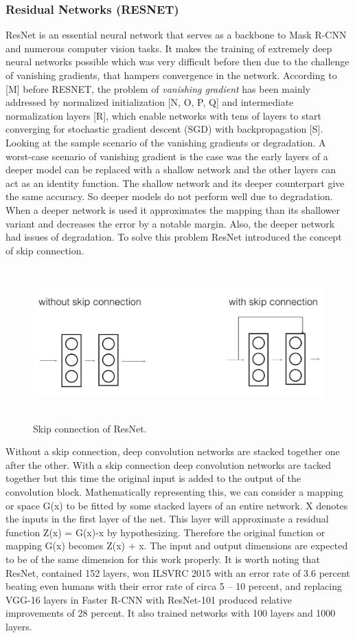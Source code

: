 \subsubsection{Residual Networks (RESNET)}
ResNet is an essential neural network that serves as a backbone to Mask R-CNN and numerous computer vision tasks. It makes the training of extremely deep neural networks possible which was very difficult before then due to the challenge of vanishing gradients, that hampers convergence in the network. According to [M] before RESNET, the problem of \textit{vanishing gradient} has been mainly addressed by normalized initialization [N, O, P, Q] and intermediate normalization layers [R], which enable networks with tens of layers to start converging for stochastic gradient descent (SGD) with backpropagation [S].
Looking at the sample scenario of the vanishing gradients or degradation. A worst-case scenario of vanishing gradient is the case was the early layers of a deeper model can be replaced with a shallow network and the other layers can act as an identity function.  The shallow network and its deeper counterpart give the same accuracy. So deeper models do not perform well due to degradation. When a deeper network is used it approximates the mapping than its shallower variant and decreases the error by a notable margin. Also, the deeper network had issues of degradation.
To solve this problem ResNet introduced the concept of skip connection.

\begin{figure}[H]
 \centering
 \includegraphics[height=2.3in]{images/skipconnection.jpg}
 \caption{Skip connection of ResNet.}
\end{figure}

Without a skip connection, deep convolution networks are stacked together one after the other.  With a skip connection deep convolution networks are tacked together but this time the original input is added to the output of the convolution block.
Mathematically representing this, we can consider a mapping or space G(x) to be fitted by some stacked layers of an entire network.  X denotes the inputs in the first layer of the net. This layer will approximate a residual function Z(x) = G(x)-x by hypothesizing.  Therefore the original function or mapping G(x) becomes Z(x) + x.  The input and output dimensions are expected to be of the same dimension for this work properly.  It is worth noting that ResNet, contained 152 layers, won ILSVRC 2015 with an error rate of 3.6 percent beating even humans with their error rate of circa 5 – 10 percent, and replacing VGG-16 layers in Faster R-CNN with ResNet-101 produced relative improvements of 28 percent. It also trained networks with 100 layers and 1000 layers. 

